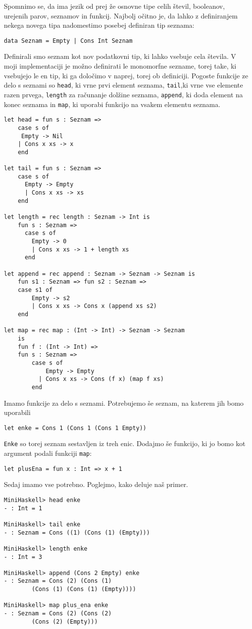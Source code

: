 \documentclass[12pt,a4paper,openany]{book}
\begin{document}
Spomnimo se, da ima jezik od prej že osnovne tipe celih števil, booleanov, urejenih parov, seznamov in funkcij. Najbolj očitno je, da lahko z definiranjem nekega novega tipa nadomestimo posebej 
definiran tip seznama:
\begin{lstlisting}
data Seznam = Empty | Cons Int Seznam
\end{lstlisting}
Definirali smo seznam kot nov podatkovni tip, ki lahko vsebuje cela števila. V moji implementaciji je možno definirati le monomorfne sezname, torej take, ki vsebujejo le en tip, ki ga določimo v naprej, torej ob definiciji. 
Pogoste funkcije ze delo s seznami so \lstinline{head}, ki vrne prvi element seznama, \lstinline{tail},ki vrne vse elemente razen prvega, \lstinline{length} za računanje 
dolžine seznama, \lstinline{append}, ki doda element na konec seznama in \lstinline{map}, ki uporabi funkcijo na vsakem elementu seznama. 
\begin{lstlisting}
let head = fun s : Seznam => 
    case s of
     Empty -> Nil
    | Cons x xs -> x
    end

let tail = fun s : Seznam =>
	case s of
	  Empty -> Empty
	  | Cons x xs -> xs
	end

let length = rec length : Seznam -> Int is
	fun s : Seznam =>
	  case s of
		Empty -> 0
		| Cons x xs -> 1 + length xs
	  end

let append = rec append : Seznam -> Seznam -> Seznam is
	fun s1 : Seznam => fun s2 : Seznam => 
	case s1 of
		Empty -> s2
		| Cons x xs -> Cons x (append xs s2)
	end

let map = rec map : (Int -> Int) -> Seznam -> Seznam 
    is
	fun f : (Int -> Int) =>
    fun s : Seznam =>
	    case s of
	        Empty -> Empty
	      | Cons x xs -> Cons (f x) (map f xs)
	    end
\end{lstlisting}
Imamo funkcije za delo s seznami. Potrebujemo še seznam, na katerem jih bomo uporabili
\begin{lstlisting}
let enke = Cons 1 (Cons 1 (Cons 1 Empty))
\end{lstlisting}
\lstinline{Enke} so torej seznam sestavljen iz treh enic. Dodajmo še funkcijo, ki jo bomo kot argument podali funkciji \lstinline{map}:
\begin{lstlisting}
let plusEna = fun x : Int => x + 1
\end{lstlisting}
Sedaj imamo vse potrebno. Poglejmo, kako deluje naš primer.
\begin{lstlisting}
MiniHaskell> head enke
- : Int = 1

MiniHaskell> tail enke
- : Seznam = Cons ((1) (Cons (1) (Empty)))

MiniHaskell> length enke
- : Int = 3

MiniHaskell> append (Cons 2 Empty) enke
- : Seznam = Cons (2) (Cons (1) 
        (Cons (1) (Cons (1) (Empty))))

MiniHaskell> map plus_ena enke
- : Seznam = Cons (2) (Cons (2) 
        (Cons (2) (Empty)))
\end{lstlisting}
\end{document}
